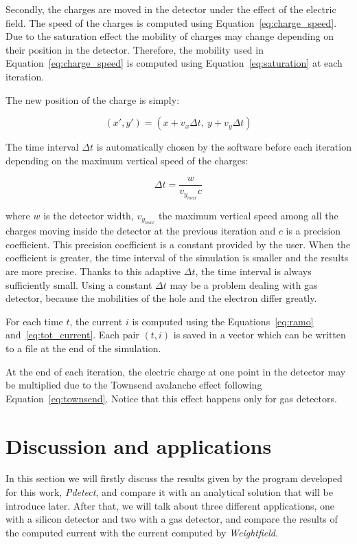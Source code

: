 \documentclass[11pt]{article}
\begin{document}
	Secondly, the charges are moved in the detector under the effect of the electric
	field. The speed of the charges is computed using Equation~\ref{eq:charge_speed}.
	Due to the saturation effect the mobility of charges may change depending on
	their position in the detector. Therefore, the mobility used in Equation~\ref{eq:charge_speed}
	is computed using Equation~\ref{eq:saturation} at each iteration.



	The new position of the charge is simply:

	\[(x',y') = (x + v_x \Delta t, \ y + v_y \Delta t)\]

	The time interval $\Delta t$ is automatically chosen by the software before
	each iteration depending on the maximum vertical speed of the charges:

	\[\Delta t = \frac{w}{v_{y_{max}} c}\]

	where $w$ is the detector width, $v_{y_{max}}$ the maximum vertical speed
	among all the charges moving inside the detector at the previous iteration and
	$c$ is a precision coefficient. This precision coefficient is a constant provided
	by the user. When the coefficient is greater, the time interval
	of the simulation is smaller and the results are more precise.
	Thanks to this adaptive $\Delta t$, the time interval is always sufficiently small.
	Using a constant $\Delta t$ may be a problem dealing with gas detector, because
	the mobilities of the hole and the electron differ greatly.

	For each time $t$, the current $i$ is computed using the Equations~\ref{eq:ramo}
	and~\ref{eq:tot_current}. Each pair $(t, i)$ is saved in a vector which can be
	written to a file at the end of the simulation.

	At the end of each iteration, the electric charge at one point in the detector
	may be multiplied due to the Townsend avalanche effect following Equation~\ref{eq:townsend}.
	Notice that this effect happens only for gas detectors.

\section{Discussion and applications}

	In this section we will firstly discuss the results given by the program developed
	for this work, \textit{Pdetect}, and compare it with an analytical solution that will be
	introduce later. After that, we will talk about three different applications, one with a
	silicon detector and two with a gas detector, and compare the results of the computed
	current with the current computed by \textit{Weightfield}.
\end{document}
